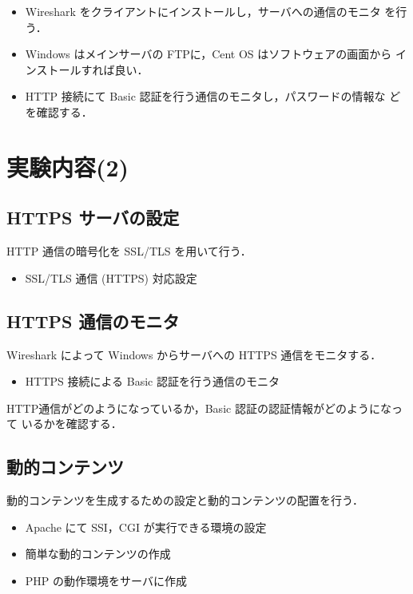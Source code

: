  \begin{itemize}
 \item Wireshark をクライアントにインストールし，サーバへの通信のモニタ
       を行う．
 \item Windows はメインサーバの FTPに，Cent OS はソフトウェアの画面から
       インストールすれば良い．
 \item HTTP 接続にて Basic 認証を行う通信のモニタし，パスワードの情報な
       どを確認する．
 \end{itemize}


\section{実験内容(2)}

\subsection{HTTPS サーバの設定}

HTTP 通信の暗号化を SSL/TLS を用いて行う．

\begin{itemize}
\item SSL/TLS 通信 (HTTPS) 対応設定
\end{itemize}

\subsection{HTTPS 通信のモニタ}

Wireshark によって Windows からサーバへの HTTPS 通信をモニタする．
\begin{itemize}
 \item HTTPS 接続による Basic 認証を行う通信のモニタ
\end{itemize}

HTTP通信がどのようになっているか，Basic 認証の認証情報がどのようになって
いるかを確認する．

\subsection{動的コンテンツ}

動的コンテンツを生成するための設定と動的コンテンツの配置を行う．
\begin{itemize}
\item Apache にて SSI，CGI が実行できる環境の設定
\item 簡単な動的コンテンツの作成
\item PHP の動作環境をサーバに作成
\end{itemize}

